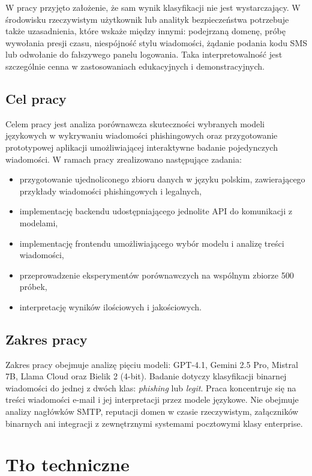 \documentclass[12pt,a4paper,openany]{report}
\begin{document}
W pracy przyjęto założenie, że sam wynik klasyfikacji nie jest wystarczający. W środowisku rzeczywistym użytkownik lub analityk bezpieczeństwa potrzebuje także uzasadnienia, które wskaże między innymi: podejrzaną domenę, próbę wywołania presji czasu, niespójność stylu wiadomości, żądanie podania kodu SMS lub odwołanie do fałszywego panelu logowania. Taka interpretowalność jest szczególnie cenna w zastosowaniach edukacyjnych i demonstracyjnych.

\section{Cel pracy}

Celem pracy jest analiza porównawcza skuteczności wybranych modeli językowych w wykrywaniu wiadomości phishingowych oraz przygotowanie prototypowej aplikacji umożliwiającej interaktywne badanie pojedynczych wiadomości. W ramach pracy zrealizowano następujące zadania:

\begin{itemize}
    \item przygotowanie ujednoliconego zbioru danych w języku polskim, zawierającego przykłady wiadomości phishingowych i legalnych,
    \item implementację backendu udostępniającego jednolite API do komunikacji z modelami,
    \item implementację frontendu umożliwiającego wybór modelu i analizę treści wiadomości,
    \item przeprowadzenie eksperymentów porównawczych na wspólnym zbiorze 500 próbek,
    \item interpretację wyników ilościowych i jakościowych.
\end{itemize}

\section{Zakres pracy}

Zakres pracy obejmuje analizę pięciu modeli: GPT-4.1, Gemini 2.5 Pro, Mistral 7B, Llama Cloud oraz Bielik 2 (4-bit). Badanie dotyczy klasyfikacji binarnej wiadomości do jednej z dwóch klas: \textit{phishing} lub \textit{legit}. Praca koncentruje się na treści wiadomości e-mail i jej interpretacji przez modele językowe. Nie obejmuje analizy nagłówków SMTP, reputacji domen w czasie rzeczywistym, załączników binarnych ani integracji z zewnętrznymi systemami pocztowymi klasy enterprise.

\chapter{Tło techniczne}
\end{document}
